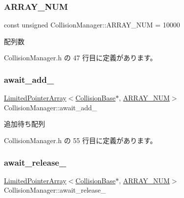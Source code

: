 \mbox{\label{class_collision_manager_addbc64e1fa0b01f3be07c897887f44ec}} 
\subsubsection{\texorpdfstring{A\+R\+R\+A\+Y\+\_\+\+N\+UM}{ARRAY\_NUM}}
{\footnotesize\ttfamily const unsigned Collision\+Manager\+::\+A\+R\+R\+A\+Y\+\_\+\+N\+UM = 10000\hspace{0.3cm}{\ttfamily [static]}}



配列数 



 Collision\+Manager.\+h の 47 行目に定義があります。

\mbox{\label{class_collision_manager_aca55a8f7b3f67f58b5455cf1ac17fc8b}} 
\subsubsection{\texorpdfstring{await\+\_\+add\+\_\+}{await\_add\_}}
{\footnotesize\ttfamily \mbox{\hyperlink{class_limited_pointer_array}{Limited\+Pointer\+Array}}$<$\mbox{\hyperlink{class_collision_base}{Collision\+Base}}$\ast$, \mbox{\hyperlink{class_collision_manager_addbc64e1fa0b01f3be07c897887f44ec}{A\+R\+R\+A\+Y\+\_\+\+N\+UM}}$>$ Collision\+Manager\+::await\+\_\+add\+\_\+\hspace{0.3cm}{\ttfamily [private]}}



追加待ち配列 



 Collision\+Manager.\+h の 55 行目に定義があります。

\mbox{\label{class_collision_manager_a077c3b33557c56afef69c69698fc76e0}} 
\subsubsection{\texorpdfstring{await\+\_\+release\+\_\+}{await\_release\_}}
{\footnotesize\ttfamily \mbox{\hyperlink{class_limited_pointer_array}{Limited\+Pointer\+Array}}$<$\mbox{\hyperlink{class_collision_base}{Collision\+Base}}$\ast$, \mbox{\hyperlink{class_collision_manager_addbc64e1fa0b01f3be07c897887f44ec}{A\+R\+R\+A\+Y\+\_\+\+N\+UM}}$>$ Collision\+Manager\+::await\+\_\+release\+\_\+\hspace{0.3cm}{\ttfamily [private]}}



